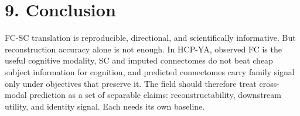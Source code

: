\section{9. Conclusion}\label{9-conclusion}

FC-SC translation is reproducible, directional, and scientifically informative. But reconstruction accuracy alone is not enough. In HCP-YA, observed FC is the useful cognitive modality, SC and imputed connectomes do not beat cheap subject information for cognition, and predicted connectomes carry family signal only under objectives that preserve it. The field should therefore treat cross-modal prediction as a set of separable claims: reconstructability, downstream utility, and identity signal. Each needs its own baseline.
